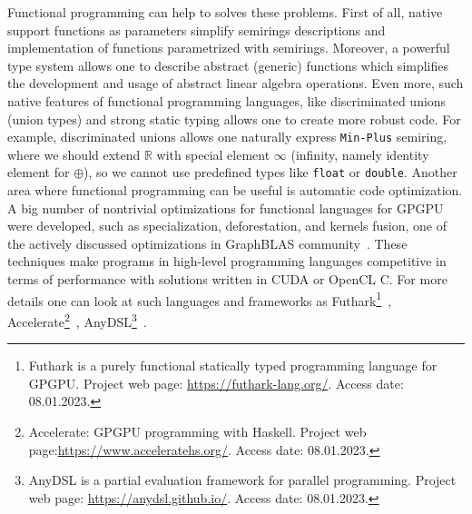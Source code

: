 Functional programming can help to solves these problems.
First of all, native support functions as parameters simplify semirings descriptions and implementation of functions parametrized with semirings. 
Moreover, a powerful type system allows one to describe abstract (generic) functions which simplifies the development and usage of abstract linear algebra operations. 
Even more, such native features of functional programming languages, like discriminated unions (union types) and strong static typing allows one to create more robust code.
For example, discriminated unions allows one naturally express \texttt{Min-Plus} semiring, where we should extend $\mathbb{R}$ with special element $\infty$ (infinity, namely identity element for $\oplus$), so we cannot use predefined types like \texttt{float} or \texttt{double}.
Another area where functional programming can be useful is automatic code optimization.
A big number of nontrivial optimizations for functional languages for GPGPU were developed, such as specialization, deforestation, and kernels fusion, one of the actively discussed optimizations in GraphBLAS community~\cite{10.1145/3466795}.
These techniques make programs in high-level programming languages competitive in terms of performance with solutions written in CUDA or OpenCL C. 
For more details one can look at such languages and frameworks as Futhark\footnote{Futhark is a purely functional statically typed programming language for GPGPU. Project web page: \url{https://futhark-lang.org/}. Access date: 08.01.2023.}~\cite{Henriksen:2017:FPF:3062341.3062354}, Accelerate\footnote{Accelerate: GPGPU programming with Haskell. Project web page:\url{https://www.acceleratehs.org/}. Access date: 08.01.2023.}~\cite{10.1145/2544174.2500595}, AnyDSL\footnote{AnyDSL is a partial evaluation framework for parallel programming. Project web page: \url{https://anydsl.github.io/}. Access date: 08.01.2023.}~\cite{10.1145/3276489}.

